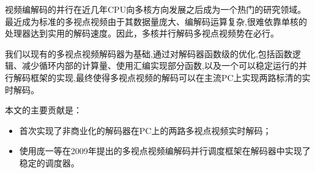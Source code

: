 

\makeatletter
\ifthu@bachelor\relax\else
  \ifthu@doctor
  \else
    \ifthu@master
    \fi
  \fi
\fi
\makeatother



\begin{cabstract}

视频编解码的并行在近几年CPU向多核方向发展之后成为一个热门的研究领域。最近成为标准的多视点视频由于其数据量庞大、编解码运算复杂,很难依靠单核的处理器达到实用的解码速度。因此，多核并行解码多视点视频势在必行。

我们以现有的多视点视频解码器为基础,通过对解码器函数级的优化,包括函数逻辑、减少循环内部的计算量、使用汇编实现部分函数,以及一个可以稳定运行的并行解码框架的实现,最终使得多视点视频的解码可以在主流PC上实现两路标清的实时解码。

本文的主要贡献是：
\begin{itemize}
\item 首次实现了非商业化的解码器在PC上的两路多视点视频实时解码；
\item 使用庞一等在2009年提出的多视点视频编解码并行调度框架\cite{pang2009framework}在解码器中实现了稳定的调度器。
\end{itemize}

\end{cabstract}


